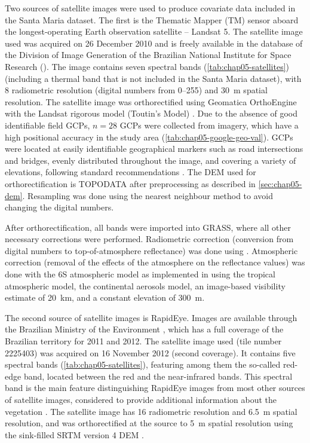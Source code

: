 Two sources of satellite images were used to produce covariate data included in the Santa Maria dataset. The 
first is the Thematic Mapper (TM) sensor aboard the longest-operating Earth observation satellite -- Landsat 5. 
The satellite image used was acquired on \num{26} December \num{2010} and is freely available in the database 
of the Division of Image Generation of the Brazilian National Institute for Space Research (\inpedgi). The 
image contains seven spectral bands (\autoref{tab:chap05-satellites}) (including a thermal band that is not 
included in the Santa Maria dataset), with \SI{8}{\bit} radiometric resolution (digital numbers from 
\numrange{0}{255}) and \SI{30}{\m} spatial resolution. The satellite image was orthorectified using 
Geomatica\textregistered{} OrthoEngine\textregistered{} with the Landsat rigorous model (Toutin's Model) 
\cite{Toutin2004, PCIGeomatics2007}. Due to the absence of good identifiable field GCPs, $n = 28$ GCPs were 
collected from \googleearth{} imagery, which have a high positional accuracy in the study area 
(\autoref{tab:chap05-google-geo-val}). GCPs were located 
at easily identifiable geographical markers such as road intersections and bridges, evenly distributed 
throughout the image, and covering a variety of elevations, following standard recommendations 
\cite{PCIGeomatics2007}. 
The DEM used for orthorectification is TOPODATA after preprocessing as described in \autoref{sec:chap05-dem}. 
Resampling was done using the nearest neighbour method to avoid changing the digital numbers.

After orthorectification, all bands were imported into GRASS, where all other necessary corrections were 
performed. Radiometric correction (conversion from digital numbers to top-of-atmosphere reflectance) was done 
using . Atmospheric correction (removal of the effects of the atmosphere on the 
reflectance values) was done with the 6S atmospheric model \cite{VermoteEtAl1997} as implemented in 
 using the tropical atmospheric model, the continental aerosols model, an image-based 
visibility estimate of \SI{20}{\km}, and a constant elevation of \SI{300}{\m}.

The second source of satellite images is RapidEye. Images are available through the Brazilian Ministry of the 
Environment \cite{Brasil2012}, which has a full coverage of the Brazilian territory for \num{2011} and 
\num{2012}. The satellite image used (tile number \num{2225403}) was acquired on \num{16} November \num{2012} 
(second coverage). It contains five spectral bands 
(\autoref{tab:chap05-satellites}), featuring among them the so-called red-edge band, located between the red 
and the near-infrared bands. This spectral band is the main feature distinguishing RapidEye images from most 
other sources of satellite images, considered to provide additional information about the vegetation 
\cite{WeicheltEtAl2013}. The satellite image has \SI{16}{\bit} radiometric resolution and \SI{6.5}{\m} spatial 
resolution, and was orthorectified at the source to \SI{5}{\m} spatial resolution using the sink-filled SRTM 
version \num{4} DEM \cite{RapidEye2013}.

